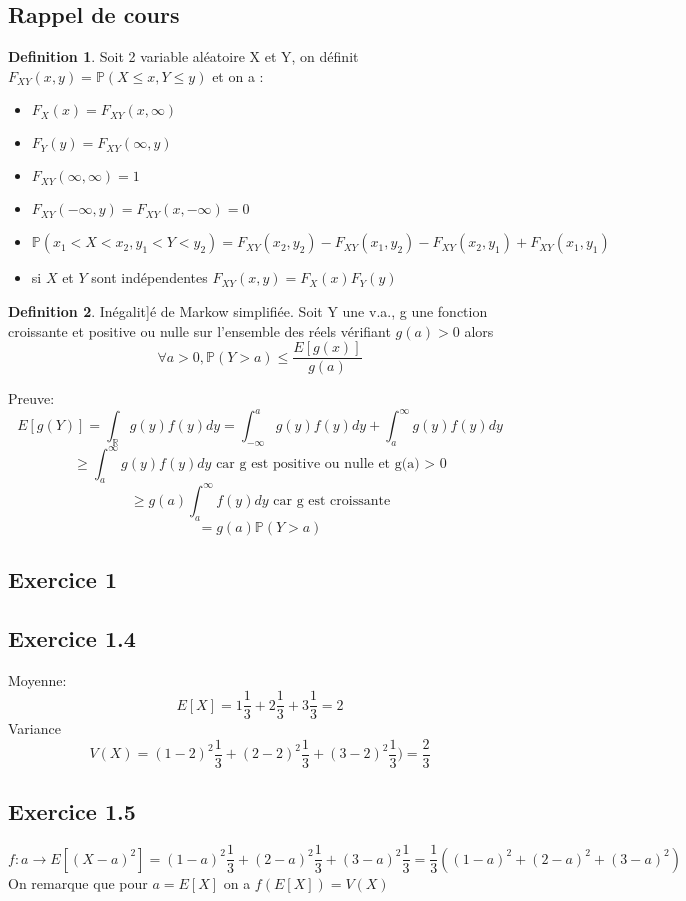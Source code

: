 \documentclass[]{book}
\theoremstyle{definition}
\newtheorem{defn}{Definition}
\newcommand{\bb}[1]{\mathbb{#1}}
\newcommand{\R}{\bb{R}}
\newcommand{\Pe}{\bb{P}}
\begin{document}
\subsection*{Rappel de cours}
\begin{defn}
Soit 2 variable al\'eatoire X et Y, on d\'efinit $F_{XY}(x,y) = \Pe(X \leq x, Y \leq y)$ et on a :
\begin{itemize}
\item $F_X(x) = F_{XY}(x,\infty)$
\item $F_Y(y) = F_{XY}(\infty,y)$
\item $F_{XY}(\infty, \infty)= 1$
\item $F_{XY}(-\infty, y)= F_{XY}(x,-\infty)  = 0$
\item $\Pe(x_1 < X < x_2, y_1 < Y < y_2) = F_{XY}(x_2,y_2) - F_{XY}(x_1,y_2) - F_{XY}(x_2,y_1) + F_{XY}(x_1,y_1)$
\item si $X$ et $Y$ sont ind\'ependentes $F_{XY}(x,y) = F_X(x)F_Y(y)$
\end{itemize}
\end{defn}


\begin{defn}
In\'egalit]\'e de Markow simplifi\'ee. Soit Y une v.a., g une fonction croissante et positive ou nulle sur l'ensemble des r\'eels v\'erifiant $g(a) > 0$ alors 
$$
\forall a > 0, \Pe(Y>a) \leq \frac{E[g(x)]}{g(a)}
$$

Preuve:
$$
E[g(Y)] = \int_{\R}{g(y)f(y)dy} = \int_{-\infty}^{a}{g(y)f(y)dy} + \int_{a}^{\infty}{g(y)f(y)dy}
$$
$$
\geq \int_{a}^{\infty}{g(y)f(y)dy} \text{ car g est positive ou nulle et g(a) > 0}
$$
$$
\geq g(a)\int_{a}^{\infty}{f(y)dy} \text{ car g est croissante}
$$
$$
= g(a) \Pe(Y > a)
$$

\end{defn}


\newpage
\subsection*{Exercice 1}
\subsection*{Exercice 1.4}
Moyenne:
$$
E[X] = 1\frac{1}{3}+2\frac{1}{3}+3\frac{1}{3} = 2
$$
Variance
$$
V(X) = (1-2)^2\frac{1}{3}+(2-2)^2\frac{1}{3}+(3-2)^2\frac{1}{3}) = \frac{2}{3}
$$

\subsection*{Exercice 1.5}
$$
f: a \to E[(X-a)^2] = (1-a)^2\frac{1}{3} + (2-a)^2\frac{1}{3} + (3-a)^2\frac{1}{3} = \frac{1}{3}((1-a)^2+(2-a)^2+(3-a)^2)
$$
On remarque que pour $a=E[X]$ on a $f(E[X]) = V(X)$
\end{document}
